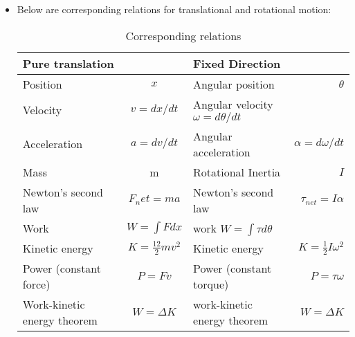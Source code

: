 \documentclass[10pt,letterpaper]{article}
\begin{document}
\begin{itemize}
\item Below are corresponding relations for translational and rotational motion: 
\begin{table}
\centering
\begin{tabular}{|lc|lr|}\hline 
\textbf{Pure translation} & & \textbf{Fixed Direction} \\ \hline \hline 
Position & $x$ & Angular position & $\theta$ \\ 
Velocity & $v=dx/dt$ & Angular velocity $\omega=d\theta /dt$ \\ 
Acceleration & $a=dv/dt$ & Angular acceleration & $\alpha=d\omega/dt$ \\ 
Mass & m & Rotational Inertia & $I$ \\ 
Newton's second law & $F_net=ma$ & Newton's second law & $\tau_{net}=I\alpha$ \\ 
Work & $W=\int F dx$ & work $W=\int \tau d\theta$ \\ 
Kinetic energy & $K=\frac{12}{2}mv^2$ & Kinetic energy & $K=\frac{1}{2}I\omega^2$ \\ 
Power (constant force) & $P=Fv$ & Power (constant torque) & $P=\tau\omega$ \\ 
Work-kinetic energy theorem & $W=\Delta K$ & work-kinetic energy theorem & $W=\Delta K$ \\ \hline 
\end{tabular}
\caption{Corresponding relations}

\end{table}


 
\end{itemize}
\end{document}
